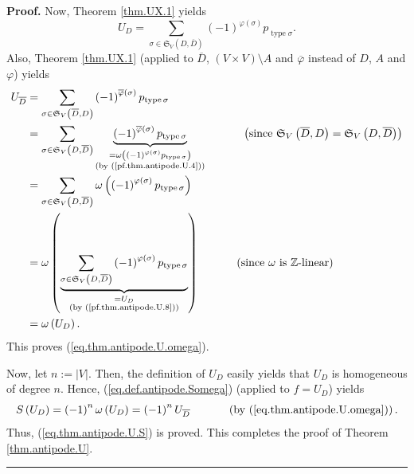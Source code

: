\documentclass[numbers=enddot,12pt,final,onecolumn,notitlepage]{scrartcl}%
\numberwithin{exer}{section}
\theoremstyle{definition}
\newenvironment{proof}[1][Proof]{\noindent\textbf{#1.} }{\ \rule{0.5em}{0.5em}}
\let\sumnonlimits\sum
\renewcommand{\sum}{\sumnonlimits\limits}
\begin{document}
\begin{proof}
Now, Theorem \ref{thm.UX.1} yields%
\begin{equation}
U_{D}=\sum_{\sigma\in\mathfrak{S}_{V}\left(  D,\overline{D}\right)  }\left(
-1\right)  ^{\varphi\left(  \sigma\right)  }p_{\operatorname*{type}\sigma}.
\label{pf.thm.antipode.U.8}%
\end{equation}
Also, Theorem \ref{thm.UX.1} (applied to $\overline{D}$, $\left(  V\times
V\right)  \setminus A$ and $\overline{\varphi}$ instead of $D$, $A$ and
$\varphi$) yields%
\begin{align*}
U_{\overline{D}}  &  =\sum_{\sigma\in\mathfrak{S}_{V}\left(  \overline
{D},D\right)  }\left(  -1\right)  ^{\overline{\varphi}\left(  \sigma\right)
}p_{\operatorname*{type}\sigma}\\
&  =\sum_{\sigma\in\mathfrak{S}_{V}\left(  D,\overline{D}\right)
}\underbrace{\left(  -1\right)  ^{\overline{\varphi}\left(  \sigma\right)
}p_{\operatorname*{type}\sigma}}_{\substack{=\omega\left(  \left(  -1\right)
^{\varphi\left(  \sigma\right)  }p_{\operatorname*{type}\sigma}\right)
\\\text{(by (\ref{pf.thm.antipode.U.4}))}}}\ \ \ \ \ \ \ \ \ \ \left(
\text{since }\mathfrak{S}_{V}\left(  \overline{D},D\right)  =\mathfrak{S}%
_{V}\left(  D,\overline{D}\right)  \right) \\
&  =\sum_{\sigma\in\mathfrak{S}_{V}\left(  D,\overline{D}\right)  }%
\omega\left(  \left(  -1\right)  ^{\varphi\left(  \sigma\right)
}p_{\operatorname*{type}\sigma}\right) \\
&  =\omega\left(  \underbrace{\sum_{\sigma\in\mathfrak{S}_{V}\left(
D,\overline{D}\right)  }\left(  -1\right)  ^{\varphi\left(  \sigma\right)
}p_{\operatorname*{type}\sigma}}_{\substack{=U_{D}\\\text{(by
(\ref{pf.thm.antipode.U.8}))}}}\right)  \ \ \ \ \ \ \ \ \ \ \left(
\text{since }\omega\text{ is }\mathbb{Z}\text{-linear}\right) \\
&  =\omega\left(  U_{D}\right)  .
\end{align*}
This proves (\ref{eq.thm.antipode.U.omega}).

Now, let $n:=\left\vert V\right\vert $. Then, the definition of $U_{D}$ easily
yields that $U_{D}$ is homogeneous of degree $n$. Hence,
(\ref{eq.def.antipode.Somega}) (applied to $f=U_{D}$) yields
\[
S\left(  U_{D}\right)  =\left(  -1\right)  ^{n}\omega\left(  U_{D}\right)
=\left(  -1\right)  ^{n}U_{\overline{D}}\ \ \ \ \ \ \ \ \ \ \left(  \text{by
(\ref{eq.thm.antipode.U.omega})}\right)  .
\]
Thus, (\ref{eq.thm.antipode.U.S}) is proved. This completes the proof of
Theorem \ref{thm.antipode.U}.
\end{proof}
\end{document}
